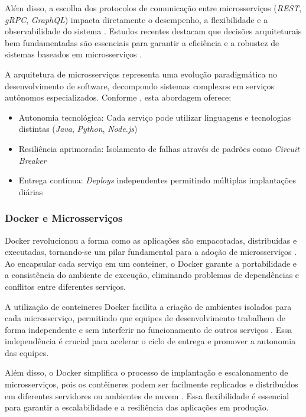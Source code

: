 Além disso, a escolha dos protocolos de comunicação entre microsserviços (\textit{\gls{REST}}, \textit{\gls{gRPC}}, \textit{\gls{GraphQL}}) impacta diretamente o desempenho, a flexibilidade e a observabilidade do sistema \cite{niswar2023performance}. Estudos recentes destacam que decisões arquiteturais bem fundamentadas são essenciais para garantir a eficiência e a robustez de sistemas baseados em microsserviços \cite{niswar2023performance, sha2023automating}. 

A arquitetura de microsserviços representa uma evolução paradigmática no desenvolvimento de software, decompondo sistemas complexos em serviços autônomos especializados. Conforme \cite{jamshidi2016systematic}, esta abordagem oferece:

\begin{itemize}
    \item Autonomia tecnológica: Cada serviço pode utilizar linguagens e tecnologias distintas (\textit{Java}, \textit{Python}, \textit{Node.js})
    \item Resiliência aprimorada: Isolamento de falhas através de padrões como \textit{Circuit Breaker}
    \item Entrega contínua: \textit{Deploys} independentes permitindo múltiplas implantações diárias
\end{itemize}

\subsubsection{Docker e Microsserviços}

Docker revolucionou a forma como as aplicações são empacotadas, distribuídas e executadas, tornando-se um pilar fundamental para a adoção de microsserviços \cite{farhan2023performance}. Ao encapsular cada serviço em um conteiner, o Docker garante a portabilidade e a consistência do ambiente de execução, eliminando problemas de dependências e conflitos entre diferentes serviços.

A utilização de conteineres Docker facilita a criação de ambientes isolados para cada microsserviço, permitindo que equipes de desenvolvimento trabalhem de forma independente e sem interferir no funcionamento de outros serviços \cite{farhan2023performance}. Essa independência é crucial para acelerar o ciclo de entrega e promover a autonomia das equipes.

Além disso, o Docker simplifica o processo de implantação e escalonamento de microsserviços, pois os contêineres podem ser facilmente replicados e distribuídos em diferentes servidores ou ambientes de nuvem \cite{farhan2023performance}. Essa flexibilidade é essencial para garantir a escalabilidade e a resiliência das aplicações em produção.

